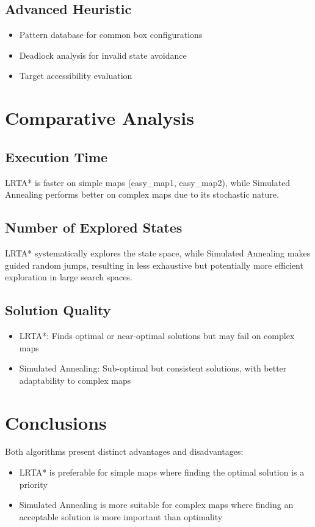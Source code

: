 \documentclass[11pt]{article.cls}
\begin{document}
\subsection{Advanced Heuristic}
\begin{itemize}
    \item Pattern database for common box configurations
    \item Deadlock analysis for invalid state avoidance
    \item Target accessibility evaluation
\end{itemize}

\section{Comparative Analysis}

\subsection{Execution Time}
LRTA* is faster on simple maps (easy_map1, easy_map2), while Simulated Annealing performs better on complex maps due to its stochastic nature.

\subsection{Number of Explored States}
LRTA* systematically explores the state space, while Simulated Annealing makes guided random jumps, resulting in less exhaustive but potentially more efficient exploration in large search spaces.

\subsection{Solution Quality}
\begin{itemize}
    \item LRTA*: Finds optimal or near-optimal solutions but may fail on complex maps
    \item Simulated Annealing: Sub-optimal but consistent solutions, with better adaptability to complex maps
\end{itemize}

\section{Conclusions}
Both algorithms present distinct advantages and disadvantages:
\begin{itemize}
    \item LRTA* is preferable for simple maps where finding the optimal solution is a priority
    \item Simulated Annealing is more suitable for complex maps where finding an acceptable solution is more important than optimality
\end{itemize}
\end{document}
